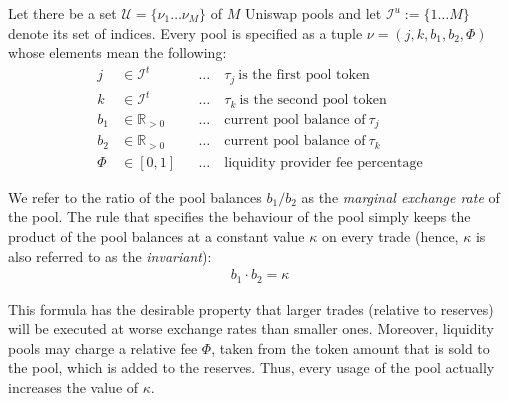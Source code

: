 \documentclass[11pt,parskip=full]{scrartcl}%
\newcommand*{\token}{\tau}                  %
\newcommand*{\uniswaps}{\mathcal{U}}        %
\newcommand*{\uniswap}{\nu}                 %
\newcommand*{\itokens}{\mathcal{I}^t}       %
\newcommand*{\iuniswaps}{\mathcal{I}^u}     %
\begin{document}
Let there be a set $\uniswaps = \{\uniswap_1 \ldots \uniswap_M\}$ of $M$ Uniswap pools and let $\iuniswaps := \{1 \ldots M\}$ denote its set of indices.
Every pool is specified as a tuple $\uniswap = (j,k,b_1,b_2,\Phi)$ whose elements mean the following:
\begin{align*}
  j &\in \itokens &&
    \ldots \quad \token_j \> \text{is the first pool token}\\
  k &\in \itokens &&
    \ldots \quad \token_k \> \text{is the second pool token}\\
  b_1 &\in \mathbb{R}_{>0} &&
    \ldots \quad \text{current pool balance of} \> \token_j\\
  b_2 &\in \mathbb{R}_{>0} &&
    \ldots \quad \text{current pool balance of} \> \token_k\\
  \Phi &\in [0,1] &&
    \ldots \quad \text{liquidity provider fee percentage}
\end{align*}

We refer to the ratio of the pool balances $b_1 / b_2$ as the \emph{marginal exchange rate} of the pool.
The rule that specifies the behaviour of the pool simply keeps the product of the pool balances at a constant value $\kappa$ on every trade (hence, $\kappa$ is also referred to as the \emph{invariant}):
\begin{align}
  b_1 \cdot b_2 = \kappa
  \label{eq:uniswap_invariant}
\end{align}

This formula has the desirable property that larger trades (relative to reserves) will be executed at worse exchange rates than smaller ones.
Moreover, liquidity pools may charge a relative fee $\Phi$, taken from the token amount that is sold to the pool, which is added to the reserves.
Thus, every usage of the pool actually increases the value of $\kappa$.
\end{document}
